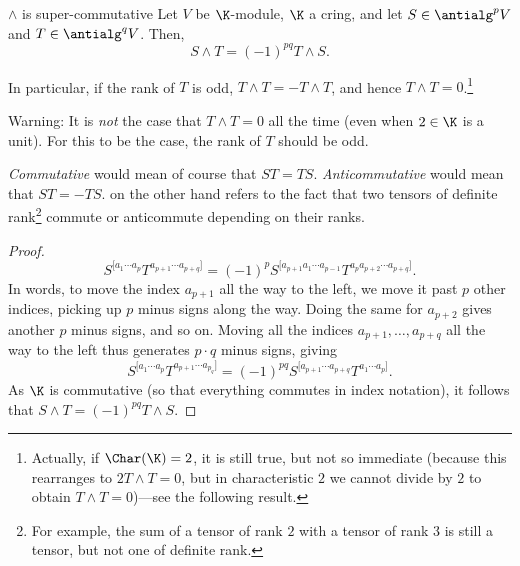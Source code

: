 \begin{prp}{$\wedge$ is super-commutative}{}
	Let $V$ be $\K$-module, $\K$ a cring, and let $S\in \antialg ^pV$ and $T\in \antialg ^qV$.  Then,
	\begin{equation}
		S\wedge T=(-1)^{pq}T\wedge S.
	\end{equation}
	\begin{rmk}
		In particular, if the rank of $T$ is odd, $T\wedge T=-T\wedge T$, and hence $T\wedge T=0$.\footnote{Actually, if $\Char (\K )=2$, it is still true, but not so immediate (because this rearranges to $2T\wedge T=0$, but in characteristic $2$ we cannot divide by $2$ to obtain $T\wedge T=0$)---see the following result.}
	\end{rmk}
	\begin{rmk}
		Warning:  It is \emph{not} the case that $T\wedge T=0$ all the time (even when $2\in \K$ is a unit).  For this to be the case, the rank of $T$ should be odd.
	\end{rmk}
	\begin{rmk}
		\emph{Commutative} would mean of course that $ST=TS$.  \emph{Anticommutative} would mean that $ST=-TS$.   on the other hand refers to the fact that two tensors of definite rank\footnote{For example, the sum of a tensor of rank $2$ with a tensor of rank $3$ is still a tensor, but not one of definite rank.} commute or anticommute depending on their ranks.
	\end{rmk}
	\begin{proof}
		\begin{equation}
		S^{[a_1\cdots a_p}T^{a_{p+1}\cdots a_{p+q}]}=(-1)^pS^{[a_{p+1}a_1\cdots a_{p-1}}T^{a_pa_{p+2}\cdots a_{p+q}]}.
		\end{equation}
		In words, to move the index $a_{p+1}$ all the way to the left, we move it past $p$ other indices, picking up $p$ minus signs along the way.  Doing the same for $a_{p+2}$ gives another $p$ minus signs, and so on.  Moving all the indices $a_{p+1},\ldots ,a_{p+q}$ all the way to the left thus generates $p\cdot q$ minus signs, giving
		\begin{equation}
		S^{[a_1\cdots a_p}T^{a_{p+1}\cdots a_{p_q}]}=(-1)^{pq}S^{[a_{p+1}\cdots a_{p+q}}T^{a_1\cdots a_p]}.
		\end{equation}
		As $\K$ is commutative (so that everything commutes in index notation), it follows that $S\wedge T=(-1)^{pq}T\wedge S$.
	\end{proof}
\end{prp}
